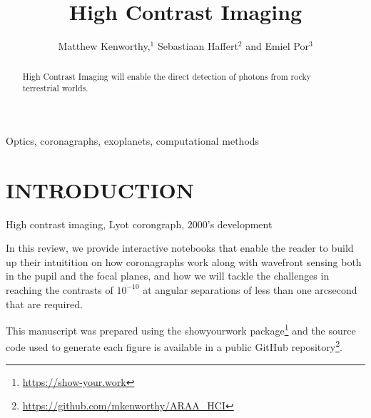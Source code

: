 \documentclass[letterpaper]{ar-1col}
\newcommand{\project}[1]{\textsf{#1}}
\begin{document}

\title{High Contrast Imaging}

\author{Matthew Kenworthy,$^1$ Sebastiaan Haffert$^2$ and Emiel Por$^3$
  }

\begin{abstract}
High Contrast Imaging will enable the direct detection of photons from rocky terrestrial worlds.
\end{abstract}

\begin{keywords}
 Optics, coronagraphs, exoplanets, computational methods

\end{keywords}
\maketitle

\tableofcontents

\section{INTRODUCTION}
\label{sec:intro}

High contrast imaging, Lyot corongraph, 2000's development


In this review, we provide interactive notebooks that enable the reader to build up their intuitition on how coronagraphs work along with wavefront sensing both in the pupil and the focal planes, and how we will tackle the challenges in reaching the contrasts of $10^{-10}$ at angular separations of less than one arcsecond that are required.


\begin{armarginnote}[]
\end{armarginnote}

This manuscript was prepared using the \project{showyourwork} package\footnote{\url{https://show-your.work}} and the source code used to generate each figure is available in a public \project{GitHub} repository\footnote{\url{https://github.com/mkenworthy/ARAA_HCI}}.
\end{document}
